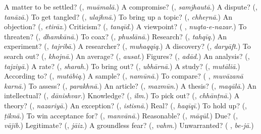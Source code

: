 \begin{tcolorbox}[breakable,colback=teal!4,colframe=teal!35!black,title={Before you move on}]
A matter to be settled? (\textbf{}, \emph{muāmalā}.) A compromise? (\textbf{}, \emph{samjhautā}.) A dispute? (\textbf{}, \emph{tanāzā}.) To get tangled? (\textbf{}, \emph{ulajhnā}.) To bring up a topic? (\textbf{}, \emph{chheṛnā}.) An objection? (\textbf{}, \emph{etirāz}.) Criticism? (\textbf{}, \emph{tanqīd}.) A viewpoint? (\textbf{ }, \emph{nuqta-e-nazar}.) To threaten? (\textbf{}, \emph{dhamkānā}.) To coax? (\textbf{}, \emph{phuslānā}.) Research? (\textbf{}, \emph{tahqīq}.) An experiment? (\textbf{}, \emph{tajribā}.) A researcher? (\textbf{}, \emph{muhaqqiq}.) A discovery? (\textbf{}, \emph{daryāft}.) To search out? (\textbf{}, \emph{khojnā}.) An average? (\textbf{}, \emph{ausat}.) Figures? (\textbf{}, \emph{adād}.) An analysis? (\textbf{}, \emph{tajziyā}.) A rate? (\textbf{}, \emph{sharah}.) To bring out? (\textbf{}, \emph{ubhārnā}.) A study? (\textbf{}, \emph{mutāliā}.) According to? (\textbf{}, \emph{mutābiq}.) A sample? (\textbf{}, \emph{namūnā}.) To compare? (\textbf{ }, \emph{muvāzanā karnā}.) To assess? (\textbf{}, \emph{parakhnā}.) An article? (\textbf{}, \emph{mazmūn}.) A thesis? (\textbf{}, \emph{maqālā}.) An intellectual? (\textbf{}, \emph{dānishvar}.) Knowledge? (\textbf{}, \emph{ilm}.) To pick out? (\textbf{}, \emph{chhānṭnā}.) A theory? (\textbf{}, \emph{nazariyā}.) An exception? (\textbf{}, \emph{istisnā}.) Real? (\textbf{}, \emph{haqīqī}.) To hold up? (\textbf{}, \emph{ṭiknā}.) To win acceptance for? (\textbf{}, \emph{manvānā}.) Reasonable? (\textbf{}, \emph{māqūl}.) Due? (\textbf{}, \emph{vājib}.) Legitimate? (\textbf{}, \emph{jāiz}.) A groundless fear? (\textbf{}, \emph{vahm}.) Unwarranted? (\textbf{ }, \emph{be-jā}.)
\end{tcolorbox}
